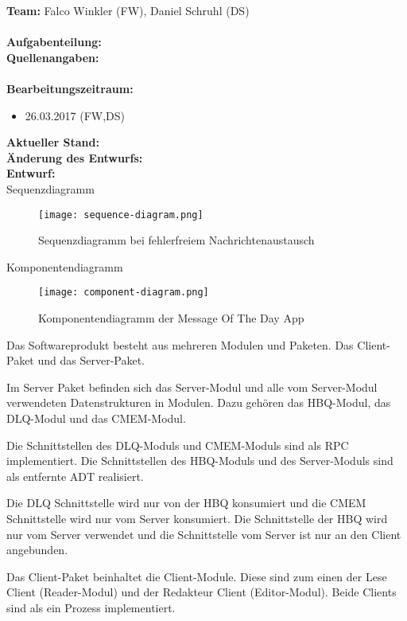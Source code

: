 \documentclass{scrreprt}
\begin{document}
\textbf{Team:} Falco Winkler (FW), Daniel Schruhl (DS)\\
\\
\textbf{Aufgabenteilung:}\\

\textbf{Quellenangaben:}\\
\\
\textbf{Bearbeitungszeitraum:}
\begin{itemize}
	\item 26.03.2017 (FW,DS)
\end{itemize}

\textbf{Aktueller Stand:}\\

\textbf{Änderung des Entwurfs:}\\

\textbf{Entwurf:}\\
Sequenzdiagramm
\begin{figure}[!htb]
\centering
	\texttt{[image: sequence-diagram.png]}
\caption[seq-dia]{Sequenzdiagramm bei fehlerfreiem Nachrichtenaustausch}
\label{fig:sequence-diagram}
\end{figure}

Komponentendiagramm
\begin{figure}[!htb]
\centering
	\texttt{[image: component-diagram.png]}
\caption[seq-dia]{Komponentendiagramm der Message Of The Day App}
\label{fig:component-diagram}
\end{figure}

Das Softwareprodukt besteht aus mehreren Modulen und Paketen. Das Client-Paket und das Server-Paket.

Im Server Paket befinden sich das Server-Modul und alle vom Server-Modul verwendeten Datenstrukturen in Modulen.
Dazu gehören das HBQ-Modul, das DLQ-Modul und das CMEM-Modul.

Die Schnittstellen des DLQ-Moduls und CMEM-Moduls sind als RPC implementiert. Die Schnittstellen des HBQ-Moduls und des
Server-Moduls sind als entfernte ADT realisiert.

Die DLQ Schnittstelle wird nur von der HBQ konsumiert und die CMEM Schnittstelle wird nur vom Server konsumiert.
Die Schnittstelle der HBQ wird nur vom Server verwendet und die Schnittstelle vom Server ist nur an den Client angebunden.

Das Client-Paket beinhaltet die Client-Module. Diese sind zum einen der Lese Client (Reader-Modul) und der Redakteur
Client (Editor-Modul). Beide Clients sind als ein Prozess implementiert.
\end{document}
